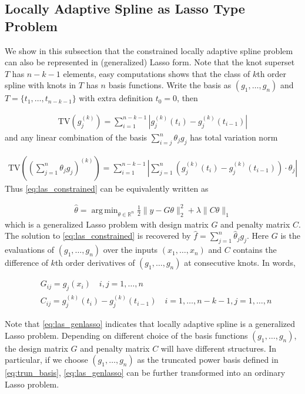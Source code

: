 \documentclass[a4paper]{article}
\DeclareMathOperator*{\argmin}{arg\,min}
\newcommand{\RR}{\mathbb{R}}
\begin{document}
\subsection{Locally Adaptive Spline as Lasso Type Problem}
\label{subsec:lasaslasso}
We show in this subsection that the constrained locally adaptive spline problem can also be represented in (generalized) Lasso form. Note that the knot superset $T$ has $n-k-1$ elements, easy computations shows that the class of $k$th order spline with knots in $T$ has $n$ basis functions. Write the basis as $(g_1,\ldots, g_n)$ and $T = \{t_1,\ldots, t_{n-k-1}\}$ with extra definition $t_0 = 0$, then

\begin{align*}
\text{TV}(g_j^{(k)}) = \sum_{i=1}^{n-k-1} |g_j^{(k)}(t_i) - g_j^{(k)}(t_{i-1})|
\end{align*}
and any linear combination of the basis $\sum_{i=j}^n \theta_jg_j$ has total variation norm

\begin{align*}
\text{TV}((\sum_{j=1}^n\theta_jg_j)^{(k)}) = \sum_{i=1}^{n-k-1}|\sum_{j=1}^n (g_j^{(k)}(t_i) - g_j^{(k)}(t_{i-1}))\cdot\theta_j|
\end{align*}
Thus \eqref{eq:las_constrained} can be equivalently written as

\begin{align}
\hat{\theta} = \argmin_{\theta\in\RR^n} \frac{1}{2}\|y-G\theta\|_2^2 + \lambda\|C\theta\|_1
\label{eq:las_genlasso}
\end{align}
which is a generalized Lasso problem with design matrix $G$ and penalty matrix $C$. The solution to \eqref{eq:las_constrained} is recovered by $\hat{f} = \sum_{j=1}^n \hat{\theta}_jg_j$. Here $G$ is the evaluations of $(g_1,\ldots, g_n)$ over the inputs $(x_1,\ldots, x_n)$ and $C$ contains the difference of $k$th order derivatives of $(g_1,\ldots, g_n)$ at consecutive knots. In words,

\begin{equation}
\begin{aligned}
&G_{ij} = g_j(x_i) \quad i,j = 1,\ldots, n\\
&C_{ij} = g_j^{(k)}(t_i) - g_j^{(k)}(t_{i-1}) \quad i = 1,\ldots, n-k-1, j= 1,\ldots, n
\label{eq:lars_design}
\end{aligned}
\end{equation}

Note that \eqref{eq:las_genlasso} indicates that locally adaptive spline is a generalized Lasso problem. Depending on different choice of the basis functions $(g_1,\ldots, g_n)$, the design matrix $G$ and penalty matrix $C$ will have different structures. In particular, if we choose $(g_1,\ldots, g_n)$ as the truncated power basis defined in \eqref{eq:trun_basis}, \eqref{eq:las_genlasso} can be further transformed into an ordinary Lasso problem. 
\end{document}
